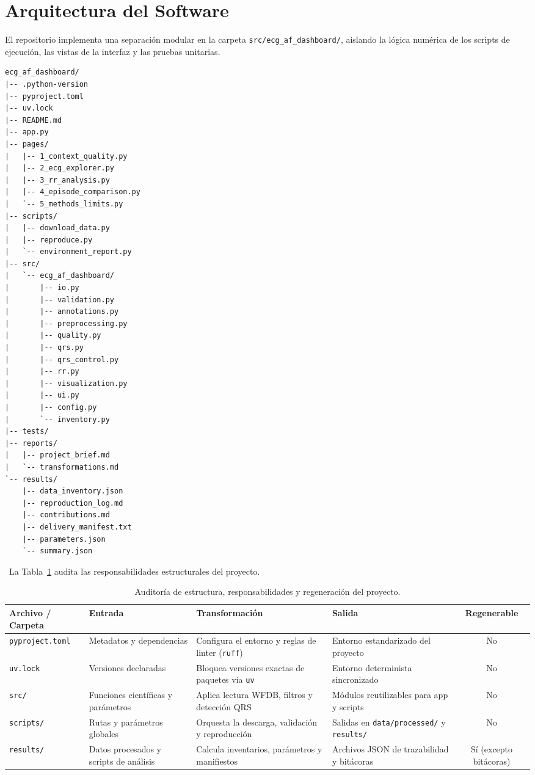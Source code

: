 \documentclass[11pt,a4paper]{article}
\begin{document}
\section{Arquitectura del Software}
El repositorio implementa una separación modular en la carpeta \texttt{src/ecg\_af\_dashboard/}, aislando la lógica numérica de los scripts de ejecución, las vistas de la interfaz y las pruebas unitarias.

\begin{verbatim}
ecg_af_dashboard/
|-- .python-version
|-- pyproject.toml
|-- uv.lock
|-- README.md
|-- app.py
|-- pages/
|   |-- 1_context_quality.py
|   |-- 2_ecg_explorer.py
|   |-- 3_rr_analysis.py
|   |-- 4_episode_comparison.py
|   `-- 5_methods_limits.py
|-- scripts/
|   |-- download_data.py
|   |-- reproduce.py
|   `-- environment_report.py
|-- src/
|   `-- ecg_af_dashboard/
|       |-- io.py
|       |-- validation.py
|       |-- annotations.py
|       |-- preprocessing.py
|       |-- quality.py
|       |-- qrs.py
|       |-- qrs_control.py
|       |-- rr.py
|       |-- visualization.py
|       |-- ui.py
|       |-- config.py
|       `-- inventory.py
|-- tests/
|-- reports/
|   |-- project_brief.md
|   `-- transformations.md
`-- results/
    |-- data_inventory.json
    |-- reproduction_log.md
    |-- contributions.md
    |-- delivery_manifest.txt
    |-- parameters.json
    `-- summary.json
\end{verbatim}

\noindent\ La Tabla~\ref{tab:auditoria} audita las responsabilidades estructurales del proyecto.

\begin{table}[htbp]
  \centering
  \caption{Auditoría de estructura, responsabilidades y regeneración del proyecto.}
  \label{tab:auditoria}
  \small
  \begin{tabular}{p{2.5cm} p{3.2cm} p{3.2cm} p{3.2cm} c}
    \toprule
    \textbf{Archivo / Carpeta} & \textbf{Entrada} & \textbf{Transformación} & \textbf{Salida} & \textbf{Regenerable} \\
    \midrule
    \texttt{pyproject.toml} & Metadatos y dependencias & Configura el entorno y reglas de linter (\texttt{ruff}) & Entorno estandarizado del proyecto & No \\
    \addlinespace
    \texttt{uv.lock} & Versiones declaradas & Bloquea versiones exactas de paquetes vía \texttt{uv} & Entorno determinista sincronizado & No \\
    \addlinespace
    \texttt{src/} & Funciones científicas y parámetros & Aplica lectura WFDB, filtros y detección QRS & Módulos reutilizables para app y scripts & No \\
    \addlinespace
    \texttt{scripts/} & Rutas y parámetros globales & Orquesta la descarga, validación y reproducción & Salidas en \texttt{data/processed/} y \texttt{results/} & No \\
    \addlinespace
    \texttt{results/} & Datos procesados y scripts de análisis & Calcula inventarios, parámetros y manifiestos & Archivos JSON de trazabilidad y bitácoras & Sí (excepto bitácoras) \\
    \bottomrule
  \end{tabular}
\end{table}
\end{document}

